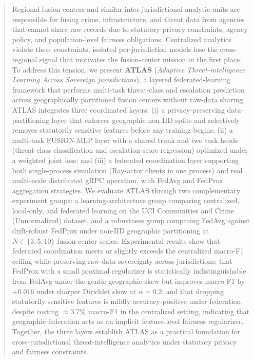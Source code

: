 \documentclass[conference]{IEEEtran}
\begin{document}
\begin{abstract}
Regional fusion centers and similar inter-jurisdictional analytic units are responsible for fusing crime, infrastructure, and threat data from agencies that cannot share raw records due to statutory privacy constraints, agency policy, and population-level fairness obligations. Centralized analytics violate these constraints; isolated per-jurisdiction models lose the cross-regional signal that motivates the fusion-center mission in the first place. To address this tension, we present \textbf{ATLAS} (\textit{Adaptive Threat-intelligence Learning Across Sovereign jurisdictions}), a layered federated-learning framework that performs multi-task threat-class and escalation prediction across geographically partitioned fusion centers without raw-data sharing. ATLAS integrates three coordinated layers: (i) a privacy-preserving data-partitioning layer that enforces geographic non-IID splits and selectively removes statutorily sensitive features before any training begins; (ii) a multi-task FUSION-MLP layer with a shared trunk and two task heads (threat-class classification and escalation-score regression) optimized under a weighted joint loss; and (iii) a federated coordination layer supporting both single-process simulation (Ray-actor clients in one process) and real multi-node distributed gRPC operation, with FedAvg and FedProx aggregation strategies. We evaluate ATLAS through two complementary experiment groups: a learning-architecture group comparing centralized, local-only, and federated learning on the UCI Communities and Crime (Unnormalized) dataset, and a robustness group comparing FedAvg against drift-robust FedProx under non-IID geographic partitioning at $N\in\{3,5,10\}$ fusion-center scales. Experimental results show that federated coordination meets or slightly exceeds the centralized macro-F1 ceiling while preserving raw-data sovereignty across jurisdictions; that FedProx with a small proximal regularizer is statistically indistinguishable from FedAvg under the gentle geographic skew but improves macro-F1 by $+0.016$ under sharper Dirichlet skew at $\alpha = 0.2$; and that dropping statutorily sensitive features is mildly accuracy-positive under federation despite costing $\approx 3.7$\% macro-F1 in the centralized setting, indicating that geographic federation acts as an implicit feature-level fairness regularizer. Together, the three layers establish ATLAS as a practical foundation for cross-jurisdictional threat-intelligence analytics under statutory privacy and fairness constraints.
\end{abstract}
\end{document}
